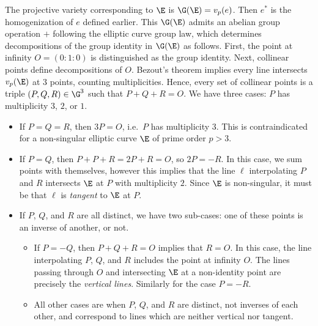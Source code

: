\documentclass[11pt,letterpaper]{article}
\theoremstyle{definition}
\newcommand{\6}{\mathbf}
\newcommand{\7}{\mathcal}
\begin{document}
The projective variety corresponding to $\E$ is $\G(\E) = v_p(e)$. Then $e^*$ is the homogenization of $e$ defined earlier. This $\G(\E)$ admits an abelian group operation $+$ following the elliptic curve group law, which determines decompositions of the group identity in $\G(\E)$ as follows. First, the point at infinity $O=(0\!:\!1\!:\!0)$ is distinguished as the group identity. Next, collinear points define decompositions of $O$. Bezout's theorem implies every line intersects $v_p(\E)$ at $3$ points, counting multiplicities. Hence, every set of collinear points is a triple $(P, Q, R) \in \G^3$ such that $P + Q + R = O$. We have three cases: $P$ has multiplicity $3$, $2$, or $1$.
\begin{itemize}
\item If $P = Q = R$, then $3P = O$, i.e.\ $P$ has multiplicity $3$. This is contraindicated for a non-singular elliptic curve $\E$ of prime order $p > 3$.

\item If $P = Q$, then $P + P + R = 2P + R = O$, so $2P = -R$. In this case, we sum points with themselves, however this implies that the line $\ell$ interpolating $P$ and $R$ intersects $\E$ at $P$ with multiplicity $2$. Since $\E$ is non-singular, it must be that $\ell$ is \textit{tangent} to $\E$ at $P$.

\item If $P$, $Q$, and $R$ are all distinct, we have two sub-cases: one of these points is an inverse of another, or not.
\begin{itemize}
\item If $P = -Q$, then $P + Q + R = O$ implies that $R = O$. In this case, the line interpolating $P$, $Q$, and $R$ includes the point at infinity $O$. The lines passing through $O$ and intersecting $\E$ at a non-identity point are precisely the \textit{vertical lines}. Similarly for the case $P = -R$. 
\item All other cases are when $P$, $Q$, and $R$ are distinct, not inverses of each other, and correspond to lines which are neither vertical nor tangent. 
\end{itemize}
\end{itemize}
\end{document}
